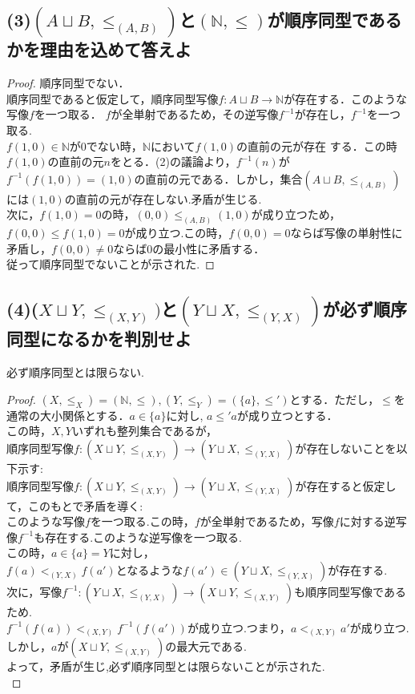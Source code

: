 \documentclass{jreport}
\begin{document}
\subsection{\normalsize{(3)$(A\sqcup B,\le_{(A,B)})$と$(\mathbb{N},\le)$が順序同型であるかを理由を込めて答えよ}}
\begin{proof}
  順序同型でない．\\
  順序同型であると仮定して，順序同型写像$f: A\sqcup B \to \mathbb{N}$が存在する．このような写像$f$を一つ取る．
  $f$が全単射であるため，その逆写像$f^{-1}$が存在し，$f^{-1}$を一つ取る.\\
  $f(1,0) \in \mathbb{N}$が0でない時，$\mathbb{N}$において$f(1,0)$の直前の元が存在
  する．この時$f(1,0)$の直前の元$n$をとる．(2)の議論より，$f^{-1}(n)$が$f^{-1}(f(1,0)) = (1,0)$の直前の元である．しかし，集合$(A\sqcup B,\le_{(A,B)})$には$(1,0)$の直前の元が存在しない.矛盾が生じる.\\
    次に，$f(1,0)=0$の時，$(0,0)\le_{(A,B)} (1,0)$が成り立つため，$f(0,0) \le f(1,0)=0$が成り立つ.この時，$f(0,0)=0$ならば写像の単射性に矛盾し，$f(0,0) \ne 0$ならば$0$の最小性に矛盾する．\\
    従って順序同型でないことが示された.
\end{proof}
\newpage
\subsection{\normalsize{(4)($X\sqcup Y ,\le_{(X, Y)})$と$(Y\sqcup X, \le_{(Y,X)})$が必ず順序同型になるかを判別せよ}}
必ず順序同型とは限らない.
\begin{proof}
  $(X,\le_{X})=(\mathbb{N},\le ),(Y, \le_{Y}) =(\{a\},\le ')$とする．ただし，$\le$を通常の大小関係とする．$a\in \{a\} $に対し, $a \le ' a$が成り立つとする．\\
  この時，$X,Y$いずれも整列集合であるが，\\
  順序同型写像$f : (X \sqcup Y, \le_{(X,Y)}) \to (Y\sqcup X, \le_{(Y,X)})$が存在しないことを以下示す:\\
  順序同型写像$f : (X \sqcup Y, \le_{(X,Y)}) \to (Y\sqcup X, \le_{(Y,X)})$が存在すると仮定して，このもとで矛盾を導く:\\
  このような写像$f$を一つ取る.この時，$f$が全単射であるため，写像$f$に対する逆写像$f^{-1}$も存在する.このような逆写像を一つ取る.\\
  この時，$a\in \{a\}=Y$に対し，\\
  $f(a) <_{(Y,X)} f(a')$となるような$f(a') \in (Y\sqcup X, \le_{(Y,X)})$が存在する.\\
  次に，写像$f^{-1}: (Y\sqcup X, \le_{(Y,X)}) \to (X\sqcup Y, \le_{(X,Y)})$も順序同型写像であるため.\\
    $f^{-1}(f(a)) <_{(X,Y)} f^{-1}(f(a'))$が成り立つ.つまり，$a <_{(X,Y)} a'$が成り立つ. しかし，$a$が$(X\sqcup Y,\le_{(X,Y)})$の最大元である. \\
    よって，矛盾が生じ,必ず順序同型とは限らないことが示された.\\
\end{proof}
\newpage
\end{document}
